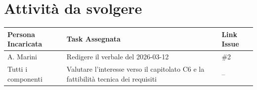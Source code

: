 \documentclass[a4paper, 10pt, colorlinks=true, linkcolor=black, urlcolor=blue, citecolor=blue, hidelinks]{article}
\begin{document}
\section{Attività da svolgere}
\begin{center}
\renewcommand{\arraystretch}{1.4}
\begin{tabular}{|p{4.2cm}|p{6.2cm}|p{2.2cm}|}
\hline
\textbf{Persona Incaricata} & \textbf{Task Assegnata} & \centering\textbf{Link Issue} \tabularnewline
\hline
A. Marini & Redigere il verbale del 2026-03-12 & \centering \#2 \tabularnewline
\hline
Tutti i componenti & Valutare l'interesse verso il capitolato C6 e la fattibilità tecnica dei requisiti & \centering -- \tabularnewline
\hline
\end{tabular}
\end{center}
\end{document}
